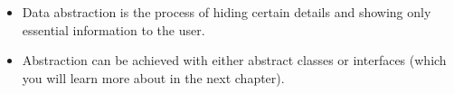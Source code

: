 \setlength{\columnsep}{3pt}
\begin{flushleft}
	
	\begin{itemize}
		\item Data abstraction is the process of hiding certain details and showing only essential information to the user. 
		\item Abstraction can be achieved with either abstract classes or interfaces (which you will learn more about in the next chapter).
		
	\end{itemize}	
	
\end{flushleft}

\newpage